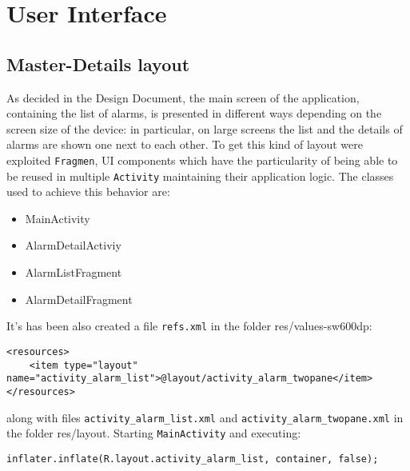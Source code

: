 


\chapter{User Interface}
\label{chap:ui}

	\section{Master-Details layout}
	As decided in the Design Document, the main screen of the application, containing the list of alarms, is presented in different ways depending on the screen size of the device: in particular, on large screens the list and the details of alarms are shown one next to each other. To get this kind of layout were exploited {\tt Fragmen}, UI components which have the particularity of being able to be reused in multiple {\tt Activity} maintaining their application logic. The classes used to achieve this behavior are:

		\begin{itemize}

			\item MainActivity

			\item AlarmDetailActiviy

			\item AlarmListFragment

			\item AlarmDetailFragment

		\end{itemize}

	It's has been also created a file {\tt refs.xml} in the folder res/values-sw600dp:

		\begin{lstlisting}
<resources>
    <item type="layout" name="activity_alarm_list">@layout/activity_alarm_twopane</item>
</resources>
		\end{lstlisting}
	along with files \texttt{activity\_alarm\_list.xml} and \texttt{activity\_alarm\_twopane.xml} in the folder res/layout.
	Starting {\tt MainActivity} and executing:

		\begin{lstlisting}
inflater.inflate(R.layout.activity_alarm_list, container, false);
		\end{lstlisting}

